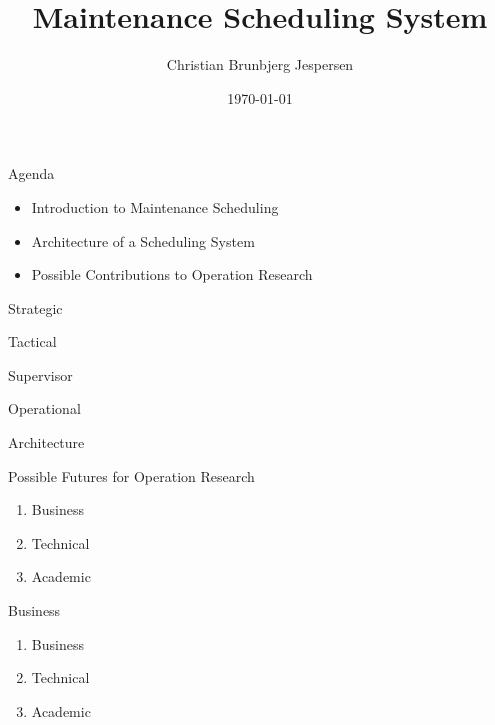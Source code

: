 \documentclass{beamer}
\title{Maintenance Scheduling System}
\author{Christian Brunbjerg Jespersen}
\institute{Your Institution}
\date{\today}
\begin{document}





\frame{\titlepage}

\begin{frame}{Agenda}
    \begin{itemize}
        \item Introduction to Maintenance Scheduling
        \item Architecture of a Scheduling System
        \item Possible Contributions to Operation Research
    \end{itemize}
\end{frame}



\begin{frame}[t]{Strategic}
\end{frame}

\begin{frame}[t]{Tactical}
\end{frame}

\begin{frame}[t]{Supervisor}
\end{frame}

\begin{frame}[t]{Operational}
\end{frame}



\begin{frame}{Architecture}
	
	
\end{frame}

\begin{frame}{}
    \begin{block}{Possible Futures for Operation Research}
        \begin{enumerate}
            \item Business
            \item Technical
            \item Academic
        \end{enumerate}
    \end{block}
\end{frame}

\begin{frame}{}
    \begin{block}{Business}
        \begin{enumerate}
            \item Business
            \item Technical
            \item Academic
        \end{enumerate}
    \end{block}
\end{frame}
\end{document}

